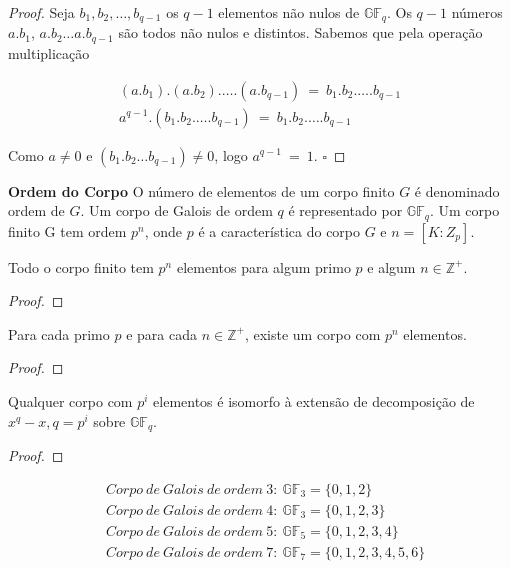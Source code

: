 \begin{proof} Seja $b_1, b_2, \ldots , b_{q-1}$ os $q-1$ elementos não nulos de $\mathbb{GF}_q$. Os $q-1$ números  $a.b_1$, $a.b_2 \ldots  a.b_{q-1}$ são todos não nulos e distintos. Sabemos que pela operação multiplicação

$$
\begin{array}{cl}
(a.b_1).(a.b_2). \ldots  .(a.b_{q-1})\ =\ b_1.b_2. \ldots  .b_{q-1}\\
a^{q-1}.(b_1.b_2. \ldots  .b_{q-1})\ =\ b_1.b_2. \ldots  .b_{q-1}
\end{array}
$$

Como $a \neq 0$ e $(b_1.b_2 \ldots  b_{q-1}) \neq 0$, logo $a^{q-1}\ =\ 1$. $\square$
\end{proof}


\begin{definition} {\bf Ordem do Corpo} \label{OrdCorpo}  O número de elementos de um corpo finito $G$ é denominado ordem de $G$. Um corpo de Galois de ordem $q$ é representado por $\mathbb{GF}_q$. Um corpo finito G tem ordem $p^n$, onde $p$ é a característica do corpo $G$ e $n = [K: Z_p]$.
\end{definition}

\begin{proposition}
Todo o corpo finito tem $p^n$ elementos para algum primo $p$ e algum $n \in \mathbb{Z}^+$.
\end{proposition}

\begin{proof}
\end{proof}

\begin{proposition}
Para cada primo $p$ e para cada  $n \in \mathbb{Z}^+$, existe um corpo com $p^n$ elementos.
\end{proposition}

\begin{proof}
\end{proof}

\begin{proposition}
Qualquer corpo com $p^i$ elementos é isomorfo à extensão de decomposição de $x^q - x, q = p^i$ sobre $\mathbb{GF}_q$.
\end{proposition}

\begin{proof}
\end{proof}

\begin{example}
\begin{align*}
& Corpo\ de\ Galois\ de\ ordem\ 3:\ \mathbb{GF}_3 = \{0, 1, 2\}\\
& Corpo\ de\ Galois\ de\ ordem\ 4:\ \mathbb{GF}_3 = \{0, 1, 2, 3\}\\
& Corpo\ de\ Galois\ de\ ordem\ 5:\ \mathbb{GF}_5 = \{0, 1, 2, 3, 4\}\\
& Corpo\ de\ Galois\ de\ ordem\ 7:\ \mathbb{GF}_7 = \{0, 1, 2, 3, 4, 5, 6\}
\end{align*}
\end{example}

